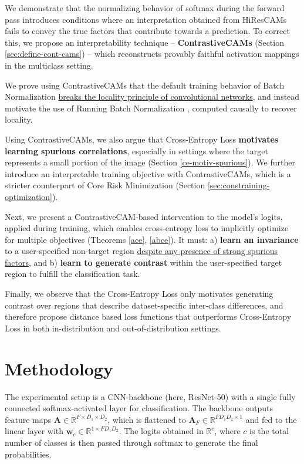 \documentclass{article}
\theoremstyle{plain}
\theoremstyle{definition}
\theoremstyle{remark}
\begin{document}
We demonstrate that the normalizing behavior of softmax during the forward pass introduces conditions where an interpretation obtained from HiResCAMs fails to convey the true factors that contribute towards a prediction. To correct this, we propose an interpretability technique -- \textbf{ContrastiveCAMs} (Section \ref{sec:define-cont-cams}) -- which reconstructs provably faithful activation mappings in the multiclass setting.

We prove using ContrastiveCAMs that the default training behavior of Batch Normalization \citep{ioffe2015batch} \underline{breaks the locality principle of convolutional networks}, and instead motivate the use of Running Batch Normalization \citep{jermeyhowardlesson10}, computed causally to recover locality.

Using ContrastiveCAMs, we also argue that Cross-Entropy Loss \citep{cox1958regression, mao2023cross} \textbf{motivates learning spurious correlations}, especially in settings where the target represents a small portion of the image (Section \ref{ce-motiv-spurious}). We further introduce an interpretable training objective with ContrastiveCAMs, which is a stricter counterpart of Core Risk Minimization \citep{singla2022core} (Section \ref{sec:constraining-optimization}).

Next, we present a ContrastiveCAM-based intervention to the model's logits, applied during training, which enables cross-entropy loss to implicitly optimize for multiple objectives (Theorems \ref{ace}, \ref{abce}). It must: a) \textbf{learn an invariance} to a user-specified non-target region \underline{despite any presence of strong spurious factors}, and b) \textbf{learn to generate contrast} within the user-specified target region to fulfill the classification task.

Finally, we observe that the Cross-Entropy Loss only motivates generating contrast over regions that describe dataset-specific inter-class differences, and therefore propose distance based loss functions that outperforms Cross-Entropy Loss in both in-distribution and out-of-distribution settings.

\section{Methodology}

The experimental setup is a CNN-backbone (here, ResNet-50) with a single fully connected softmax-activated layer for classification. The backbone outputs feature maps $\bm{A} \in \mathbb{R}^{F \times D_1 \times D_2}$, which is flattened to $\bm{A}_F \in \mathbb{R}^{FD_1D_2 \times 1}$ and fed to the linear layer with $\bm{w}_c \in \mathbb{R}^{1 \times FD_1D_2}$. The logits obtained in $\mathbb{R}^{c}$, where $c$ is the total number of classes is then passed through softmax to generate the final probabilities.
\end{document}
